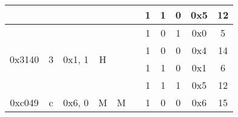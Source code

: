 \documentclass[11pt]{homework}
\newcommand{\cmark}{\ding{51}}%
\begin{document}
\begin{arabicparts}
{\begin{tabular}{|c|c|c|c|c|c|c|c|c|c|c|}
            \cline{7-11}
                                     &                                                                        &                             &                                                                   &                                                                    &                                                                      & 1                        & 1     & 0         & 0x5 & 12            \\
            \hline
            \multirow{4}{*}{0x3140}  & \multirow{4}{*}{3}                                                     & \multirow{4}{*}{0x1, 1}     & \multirow{4}{*}{H}                                                & \multirow{4}{*}{}                                                  & \multirow{4}{*}{}                                                    & 1                        & 0     & 1         & 0x0 & 5             \\
            \cline{7-11}
                                     &                                                                        &                             &                                                                   &                                                                    &                                                                      & 1                        & 0     & 0         & 0x4 & 14            \\
            \cline{7-11}
                                     &                                                                        &                             &                                                                   &                                                                    &                                                                      & 1                        & 1     & 0         & 0x1 & 6             \\
            \cline{7-11}
                                     &                                                                        &                             &                                                                   &                                                                    &                                                                      & 1                        & 1     & 1         & 0x5 & 12            \\
            \hline
            \multirow{4}{*}{0xc049}  & \multirow{4}{*}{c}                                                     & \multirow{4}{*}{0x6, 0}     & \multirow{4}{*}{M}                                                & \multirow{4}{*}{M}                                                 & \multirow{4}{*}{\cmark}                                              & 1                        & 0     & 0         & 0x6 & 15            \\

\end{tabular}}
\end{arabicparts}
\end{document}
